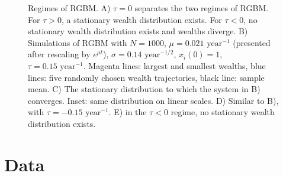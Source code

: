 \begin{figure}[!htb]
\caption{Regimes of RGBM. A) $\tau=0$ separates the two regimes of RGBM. For $\tau>0$, a stationary wealth distribution exists. For $\tau<0$, no stationary wealth distribution exists and wealths diverge. B) Simulations of RGBM with $N=1000$, $\mu=0.021 \text{ year}^{-1}$ (presented after rescaling by $e^{\mu t}$), $\sigma=0.14\text{ year}^{-1/2}$, $x_i\left(0\right)=1$, $\tau=0.15 \text{ year}^{-1}$. Magenta lines: largest and smallest wealths, blue lines: five randomly chosen wealth trajectories, black line: sample mean. C) The stationary distribution to which the system in B) converges. Inset: same distribution on linear scales. D) Similar to B), with $\tau=-0.15 \text{ year}^{-1}$. E) in the $\tau<0$ regime, no stationary wealth distribution exists.}
\end{figure}

\section{Data}\label{sec:data}

